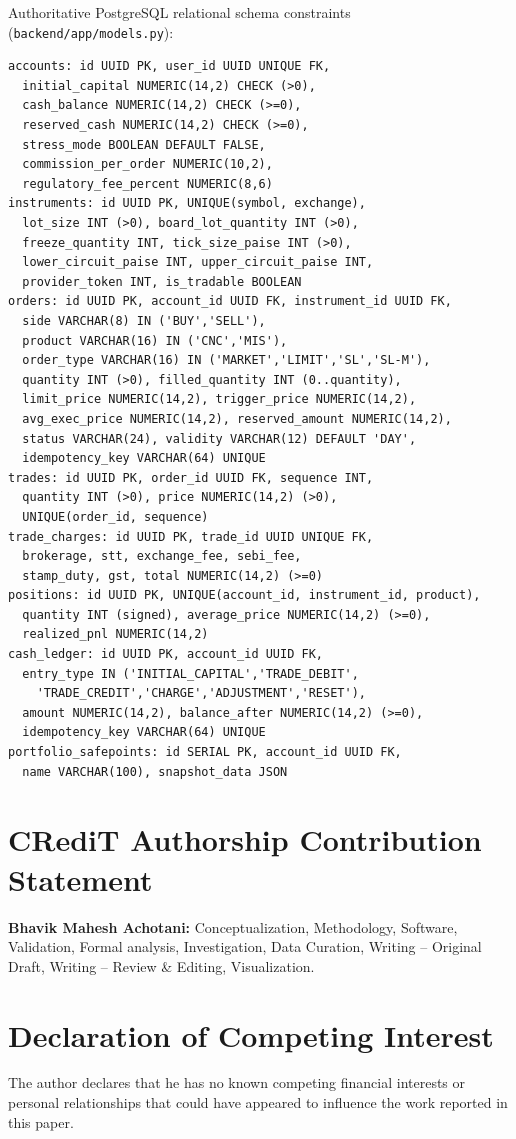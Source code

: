 \documentclass[journal,onecolumn,10pt]{IEEEtran}
\begin{document}
Authoritative PostgreSQL relational schema constraints (\texttt{backend/app/models.py}):
\begin{lstlisting}
accounts: id UUID PK, user_id UUID UNIQUE FK,
  initial_capital NUMERIC(14,2) CHECK (>0),
  cash_balance NUMERIC(14,2) CHECK (>=0),
  reserved_cash NUMERIC(14,2) CHECK (>=0),
  stress_mode BOOLEAN DEFAULT FALSE,
  commission_per_order NUMERIC(10,2),
  regulatory_fee_percent NUMERIC(8,6)
instruments: id UUID PK, UNIQUE(symbol, exchange),
  lot_size INT (>0), board_lot_quantity INT (>0),
  freeze_quantity INT, tick_size_paise INT (>0),
  lower_circuit_paise INT, upper_circuit_paise INT,
  provider_token INT, is_tradable BOOLEAN
orders: id UUID PK, account_id UUID FK, instrument_id UUID FK,
  side VARCHAR(8) IN ('BUY','SELL'),
  product VARCHAR(16) IN ('CNC','MIS'),
  order_type VARCHAR(16) IN ('MARKET','LIMIT','SL','SL-M'),
  quantity INT (>0), filled_quantity INT (0..quantity),
  limit_price NUMERIC(14,2), trigger_price NUMERIC(14,2),
  avg_exec_price NUMERIC(14,2), reserved_amount NUMERIC(14,2),
  status VARCHAR(24), validity VARCHAR(12) DEFAULT 'DAY',
  idempotency_key VARCHAR(64) UNIQUE
trades: id UUID PK, order_id UUID FK, sequence INT,
  quantity INT (>0), price NUMERIC(14,2) (>0),
  UNIQUE(order_id, sequence)
trade_charges: id UUID PK, trade_id UUID UNIQUE FK,
  brokerage, stt, exchange_fee, sebi_fee,
  stamp_duty, gst, total NUMERIC(14,2) (>=0)
positions: id UUID PK, UNIQUE(account_id, instrument_id, product),
  quantity INT (signed), average_price NUMERIC(14,2) (>=0),
  realized_pnl NUMERIC(14,2)
cash_ledger: id UUID PK, account_id UUID FK,
  entry_type IN ('INITIAL_CAPITAL','TRADE_DEBIT',
    'TRADE_CREDIT','CHARGE','ADJUSTMENT','RESET'),
  amount NUMERIC(14,2), balance_after NUMERIC(14,2) (>=0),
  idempotency_key VARCHAR(64) UNIQUE
portfolio_safepoints: id SERIAL PK, account_id UUID FK,
  name VARCHAR(100), snapshot_data JSON
\end{lstlisting}

\section*{CRediT Authorship Contribution Statement}
\textbf{Bhavik Mahesh Achotani:} Conceptualization, Methodology, Software, Validation, Formal analysis, Investigation, Data Curation, Writing -- Original Draft, Writing -- Review \& Editing, Visualization.

\section*{Declaration of Competing Interest}
The author declares that he has no known competing financial interests or personal relationships that could have appeared to influence the work reported in this paper.
\end{document}

